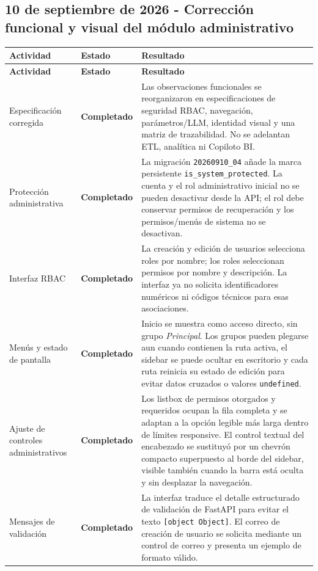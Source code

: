 \documentclass[11pt,letterpaper]{article}
\newcommand{\statusok}{\textcolor{deepgreen}{\textbf{Completado}}}
\newcommand{\file}[1]{\texttt{#1}}
\begin{document}
\clearpage
\subsection{10 de septiembre de 2026 - Corrección funcional y visual del módulo administrativo}

\begin{longtable}{@{}p{}p{}p{}@{}}
  \toprule
  \textbf{Actividad} & \textbf{Estado} & \textbf{Resultado} \\
  \midrule
  \endfirsthead
  \toprule
  \textbf{Actividad} & \textbf{Estado} & \textbf{Resultado} \\
  \midrule
  \endhead
  Especificación corregida & \statusok & Las observaciones funcionales se reorganizaron en especificaciones de seguridad RBAC, navegación, parámetros/LLM, identidad visual y una matriz de trazabilidad. No se adelantan ETL, analítica ni Copiloto BI. \\
  Protección administrativa & \statusok & La migración \file{20260910\_04} añade la marca persistente \file{is\_system\_protected}. La cuenta y el rol administrativo inicial no se pueden desactivar desde la API; el rol debe conservar permisos de recuperación y los permisos/menús de sistema no se desactivan. \\
  Interfaz RBAC & \statusok & La creación y edición de usuarios selecciona roles por nombre; los roles seleccionan permisos por nombre y descripción. La interfaz ya no solicita identificadores numéricos ni códigos técnicos para esas asociaciones. \\
  Menús y estado de pantalla & \statusok & Inicio se muestra como acceso directo, sin grupo \emph{Principal}. Los grupos pueden plegarse aun cuando contienen la ruta activa, el sidebar se puede ocultar en escritorio y cada ruta reinicia su estado de edición para evitar datos cruzados o valores \file{undefined}. \\
  Ajuste de controles administrativos & \statusok & Los listbox de permisos otorgados y requeridos ocupan la fila completa y se adaptan a la opción legible más larga dentro de límites responsive. El control textual del encabezado se sustituyó por un chevrón compacto superpuesto al borde del sidebar, visible también cuando la barra está oculta y sin desplazar la navegación. \\
  Mensajes de validación & \statusok & La interfaz traduce el detalle estructurado de validación de FastAPI para evitar el texto \file{[object Object]}. El correo de creación de usuario se solicita mediante un control de correo y presenta un ejemplo de formato válido. \\

\end{longtable}
\end{document}
